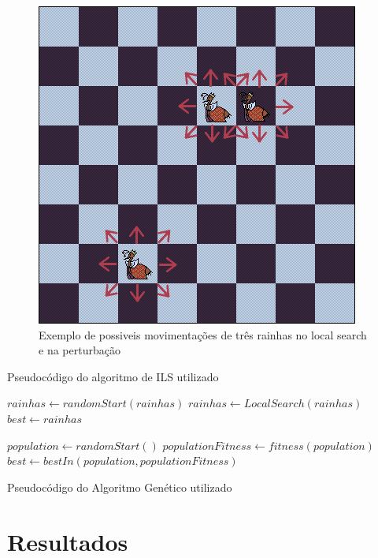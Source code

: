 \documentclass[
	article,			%
	11pt,				%
	oneside,			%
	a4paper,			%
	english,			%
	brazil,				%
	sumario=tradicional
	]{abntex2}
\begin{document}
\begin{figure}
  \centering
  \includegraphics[width=0.60\linewidth]{possiveisMovimentacoes.png}
  \caption{Exemplo de possiveis movimentações de três rainhas no local search e na perturbação}
  \label{possiveisMovimentacoes}
\end{figure}

\LinesNumbered
\begin{algorithm}[ht]
  \label{pseudoILS}
  \caption{Pseudocódigo do algoritmo de ILS utilizado}
  $rainhas \gets randomStart(rainhas)$\;
  $rainhas \gets Local Search(rainhas)$\;
  $best \gets rainhas$\;
 \end{algorithm}

 \begin{algorithm}
  $population \gets randomStart()$\;
  $populationFitness \gets fitness(population)$\;
  $best \gets bestIn(population, populationFitness)$\;
  \caption{Pseudocódigo do Algoritmo Genético utilizado}
 \end{algorithm}
 

\section{Resultados}
\end{document}
